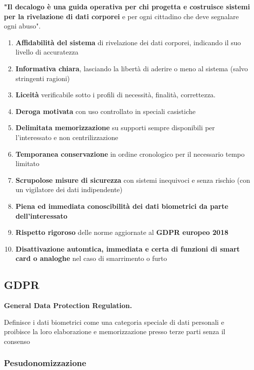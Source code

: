 \textbf{"Il decalogo è una guida operativa per chi progetta e costruisce sistemi per la rivelazione di dati corporei} e per ogni cittadino che deve segnalare ogni abuso".
\begin{enumerate}
    \item \textbf{Affidabilità del sistema} di rivelazione dei dati corporei, indicando il suo livello di accuratezza
    \item \textbf{Informativa chiara}, lasciando la libertà di aderire o meno al sistema (salvo stringenti ragioni)
    \item \textbf{Liceità} verificabile sotto i profili di necessità, finalità, correttezza.
    \item \textbf{Deroga motivata} con uso controllato in speciali casistiche
    \item \textbf{Delimitata memorizzazione} su supporti sempre disponibili per l'interessato e non centrilizzazione
    \item \textbf{Temporanea conservazione} in ordine cronologico per il necessario tempo limitato
    \item \textbf{Scrupolose misure di sicurezza} con sistemi inequivoci e senza rischio (con un vigilatore dei dati indipendente)
    \item \textbf{Piena ed immediata conoscibilità dei dati biometrici da parte dell'interessato}
    \item \textbf{Rispetto rigoroso} delle norme aggiornate al \textbf{GDPR europeo 2018}
    \item \textbf{Disattivazione automtica, immediata e certa di funzioni di smart card o analoghe} nel caso di smarrimento o furto
\end{enumerate}

\subsection{GDPR}

\textbf{General Data Protection Regulation.}

Definisce i dati biometrici come una categoria speciale di dati personali e proibisce la loro elaborazione e memorizzazione presso terze parti senza il consenso

\subsubsection{Pesudonomizzazione}

